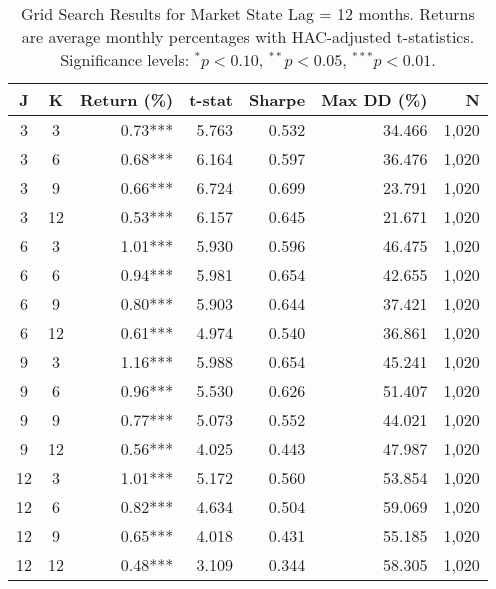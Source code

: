 \begin{table}[htbp]
\caption{Grid Search Results for Market State Lag = 12 months. Returns are average monthly percentages with HAC-adjusted t-statistics. Significance levels: $^{*}p<0.10$, $^{**}p<0.05$, $^{***}p<0.01$.}
\label{tab:grid_search_lag12}
\begin{tabular}{cc|rrrrr}
\toprule
J & K & Return (\%) & t-stat & Sharpe & Max DD (\%) & N \\
\midrule
3 & 3 & 0.73*** & 5.763 & 0.532 & 34.466 & 1,020 \\
3 & 6 & 0.68*** & 6.164 & 0.597 & 36.476 & 1,020 \\
3 & 9 & 0.66*** & 6.724 & 0.699 & 23.791 & 1,020 \\
3 & 12 & 0.53*** & 6.157 & 0.645 & 21.671 & 1,020 \\
6 & 3 & 1.01*** & 5.930 & 0.596 & 46.475 & 1,020 \\
6 & 6 & 0.94*** & 5.981 & 0.654 & 42.655 & 1,020 \\
6 & 9 & 0.80*** & 5.903 & 0.644 & 37.421 & 1,020 \\
6 & 12 & 0.61*** & 4.974 & 0.540 & 36.861 & 1,020 \\
9 & 3 & 1.16*** & 5.988 & 0.654 & 45.241 & 1,020 \\
9 & 6 & 0.96*** & 5.530 & 0.626 & 51.407 & 1,020 \\
9 & 9 & 0.77*** & 5.073 & 0.552 & 44.021 & 1,020 \\
9 & 12 & 0.56*** & 4.025 & 0.443 & 47.987 & 1,020 \\
12 & 3 & 1.01*** & 5.172 & 0.560 & 53.854 & 1,020 \\
12 & 6 & 0.82*** & 4.634 & 0.504 & 59.069 & 1,020 \\
12 & 9 & 0.65*** & 4.018 & 0.431 & 55.185 & 1,020 \\
12 & 12 & 0.48*** & 3.109 & 0.344 & 58.305 & 1,020 \\
\bottomrule
\end{tabular}
\end{table}

